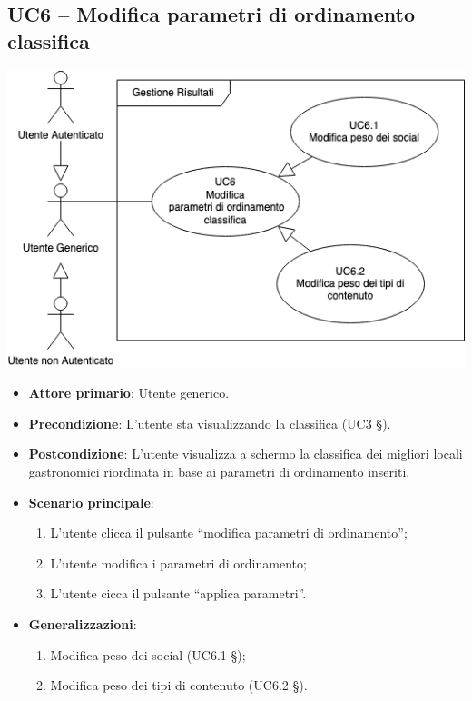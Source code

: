 \subsection{UC6 – Modifica parametri di ordinamento classifica}
\begin{center}
\includegraphics[scale=0.5]{UC_images/UC6.png}
\end{center}
\begin{itemize}
    \item \textbf{Attore primario}: Utente generico.
    \item \textbf{Precondizione}: L’utente sta visualizzando la classifica (UC3 §).
    \item \textbf{Postcondizione}: L’utente visualizza a schermo la classifica dei migliori locali gastronomici riordinata in base ai parametri di ordinamento inseriti.
    \item \textbf{Scenario principale}: 
    \begin{enumerate}
        \item L’utente clicca il pulsante “modifica parametri di ordinamento”;
        \item L’utente modifica i parametri di ordinamento;
        \item L’utente cicca il pulsante “applica parametri”.
    \end{enumerate}

    \item \textbf{Generalizzazioni}:
    \begin{enumerate}
        \item Modifica peso dei social (UC6.1 §);
        \item Modifica peso dei tipi di contenuto (UC6.2 §).
    \end{enumerate}

\end{itemize}

